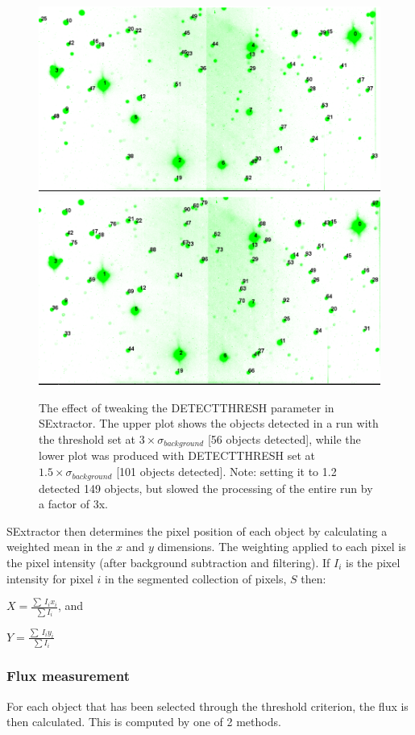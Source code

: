 \begin{figure}
  \centering
  \includegraphics[width=.8\linewidth]{images/2012-09-03_g_default.png}
  \includegraphics[width=.8\linewidth]{images/2012-09-03_g_15sigma.png}
  \caption{The effect of tweaking the DETECT\textunderscore THRESH parameter in SExtractor. The upper plot shows the objects detected in a run with the threshold set at $ 3\times \sigma_{background}$ [56 objects detected], while the lower plot was produced with DETECT\textunderscore THRESH set at $ 1.5\times \sigma_{background}$  [101 objects detected]. Note: setting it to 1.2 detected 149 objects, but slowed the processing of the entire run by a factor of 3x. }
\label{fig:tweakingthreshold}
\end{figure}

SExtractor then determines the pixel position of each object by calculating a weighted mean in the $x$ and $y$ dimensions. The weighting applied to each pixel is the pixel intensity (after background subtraction and filtering). If $I_{i}$ is the pixel intensity for pixel $i$ in the segmented collection of pixels, $S$ then:

$ X = \frac{\sum\ I_{i}x_{i}}{\sum I_i}$, and

$ Y = \frac{\sum\ I_{i}y_{i}}{\sum I_i}$


\subsubsection{Flux measurement}
For each object that has been selected through the threshold criterion, the flux is then calculated. This is computed by one of 2 methods. 

